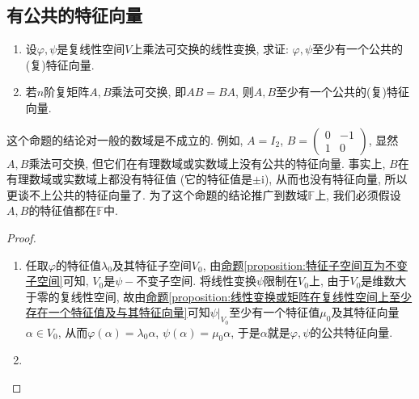 \documentclass[../../main.tex]{subfiles}
\begin{document}
\subsection{有公共的特征向量}

\begin{proposition}\label{proposition:乘法可交换必有公共的特征向量}
\begin{enumerate}
\item 设\(\varphi,\psi\)是复线性空间\(V\)上乘法可交换的线性变换, 求证: \(\varphi,\psi\)至少有一个公共的(复)特征向量.

\item 若\(n\)阶复矩阵\(A,B\)乘法可交换, 即\(AB = BA\), 则\(A,B\)至少有一个公共的(复)特征向量. 
\end{enumerate}
\end{proposition}
\begin{remark}
这个命题的结论对一般的数域是不成立的. 例如, \(A = I_{2}\), \(B=\begin{pmatrix}
0& -1\\
1& 0
\end{pmatrix}\), 显然\(A,B\)乘法可交换, 但它们在有理数域或实数域上没有公共的特征向量. 事实上, \(B\)在有理数域或实数域上都没有特征值 (它的特征值是\(\pm\mathrm{i}\)), 从而也没有特征向量, 所以更谈不上公共的特征向量了. 为了这个命题的结论推广到数域\(\mathbb{F}\)上, 我们必须假设\(A,B\)的特征值都在\(\mathbb{F}\)中.
\end{remark}
\begin{proof}
\begin{enumerate}
\item 任取\(\varphi\)的特征值\(\lambda_{0}\)及其特征子空间\(V_{0}\), 由\hyperref[proposition:特征子空间互为不变子空间]{命题\ref{proposition:特征子空间互为不变子空间}}可知, \(V_{0}\)是\(\psi -\)不变子空间. 将线性变换\(\psi\)限制在\(V_{0}\)上, 由于\(V_{0}\)是维数大于零的复线性空间, 故由\hyperref[proposition:线性变换或矩阵在复线性空间上至少存在一个特征值及与其特征向量]{命题\ref{proposition:线性变换或矩阵在复线性空间上至少存在一个特征值及与其特征向量}}可知\(\psi|_{V_{0}}\)至少有一个特征值\(\mu_{0}\)及其特征向量\(\alpha \in V_{0}\), 从而\(\varphi(\alpha)=\lambda_{0}\alpha\), \(\psi(\alpha)=\mu_{0}\alpha\), 于是\(\alpha\)就是\(\varphi,\psi\)的公共特征向量. 

\item 
\end{enumerate}

\end{proof}
\end{document}
